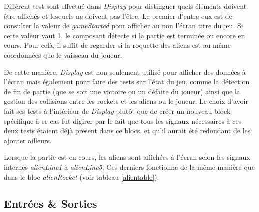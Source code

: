 \documentclass[french]{nakrule}
\begin{document}
Différent test sont effectué dans \emph{Display} pour distinguer quels éléments
doivent être affichés et lesquels ne doivent pas l'être. Le premier d'entre eux
est de consulter la valeur de \emph{gameStarted} pour afficher au non l'écran
titre du jeu. Si cette valeur vaut 1, le composant détecte si la partie est
terminée ou encore en cours. Pour celà, il suffit de regarder si la roquette des
aliens est au même coordonnées que le vaisseau du joueur.

De cette manière, \emph{Display} est non seulement utilisé pour afficher des
données à l'écran mais également pour faire des tests sur l'état du jeu, comme
la détection de fin de partie (que se soit une victoire ou un défaite du
joueur) ainsi que la gestion des collisions entre les rockets et les aliens ou
le joueur. Le choix d'avoir fait ses tests à l'intérieur de \emph{Display} plutôt
que de créer un nouveau block spécifique à ce cas fut digirer par le fait que
tous les signaux nécessaires à ces deux tests étaient déjà présent dans ce
blocs, et qu'il aurait été redondant de les ajouter ailleurs.

\begin{minipage}{.5\textwidth}

\end{minipage}
\hspace{.05\textwidth}
\begin{minipage}{.45\textwidth}
  Lorsque la partie est en cours, les aliens sont affichées à l'écran selon les
  signaux internes \emph{alienLine1} à \emph{alienLine5}. Ces derniers
  fonctionne de la même manière que dans le bloc \emph{alienRocket} (voir
  tableau \ref{alientable}).
\end{minipage}

\clearpage

\subsection{Entrées \& Sorties}
\label{subsec:Entrées_Sorties_dmc}
\end{document}
